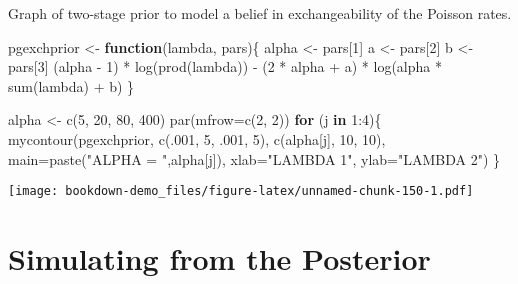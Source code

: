 \documentclass[
]{book}
\newenvironment{Shaded}{\begin{snugshade}}{\end{snugshade}}
\newcommand{\AttributeTok}[1]{\textcolor[rgb]{0.77,0.63,0.00}{#1}}
\newcommand{\ControlFlowTok}[1]{\textcolor[rgb]{0.13,0.29,0.53}{\textbf{#1}}}
\newcommand{\DecValTok}[1]{\textcolor[rgb]{0.00,0.00,0.81}{#1}}
\newcommand{\FunctionTok}[1]{\textcolor[rgb]{0.00,0.00,0.00}{#1}}
\newcommand{\NormalTok}[1]{#1}
\newcommand{\OtherTok}[1]{\textcolor[rgb]{0.56,0.35,0.01}{#1}}
\newcommand{\SpecialCharTok}[1]{\textcolor[rgb]{0.00,0.00,0.00}{#1}}
\newcommand{\StringTok}[1]{\textcolor[rgb]{0.31,0.60,0.02}{#1}}
\begin{document}
Graph of two-stage prior to model a belief in exchangeability of the Poisson rates.

\begin{Shaded}
\begin{Highlighting}[]
\NormalTok{pgexchprior }\OtherTok{\textless{}{-}} \ControlFlowTok{function}\NormalTok{(lambda, pars)\{}
\NormalTok{alpha }\OtherTok{\textless{}{-}}\NormalTok{ pars[}\DecValTok{1}\NormalTok{]}
\NormalTok{a }\OtherTok{\textless{}{-}}\NormalTok{ pars[}\DecValTok{2}\NormalTok{]}
\NormalTok{b }\OtherTok{\textless{}{-}}\NormalTok{ pars[}\DecValTok{3}\NormalTok{]}
\NormalTok{(alpha }\SpecialCharTok{{-}} \DecValTok{1}\NormalTok{) }\SpecialCharTok{*} \FunctionTok{log}\NormalTok{(}\FunctionTok{prod}\NormalTok{(lambda)) }\SpecialCharTok{{-}} 
\NormalTok{  (}\DecValTok{2} \SpecialCharTok{*}\NormalTok{ alpha }\SpecialCharTok{+}\NormalTok{ a) }\SpecialCharTok{*} \FunctionTok{log}\NormalTok{(alpha }\SpecialCharTok{*} \FunctionTok{sum}\NormalTok{(lambda) }\SpecialCharTok{+}\NormalTok{ b)}
\NormalTok{\}}
\end{Highlighting}
\end{Shaded}

\begin{Shaded}
\begin{Highlighting}[]
\NormalTok{alpha }\OtherTok{\textless{}{-}} \FunctionTok{c}\NormalTok{(}\DecValTok{5}\NormalTok{, }\DecValTok{20}\NormalTok{, }\DecValTok{80}\NormalTok{, }\DecValTok{400}\NormalTok{)}
\FunctionTok{par}\NormalTok{(}\AttributeTok{mfrow=}\FunctionTok{c}\NormalTok{(}\DecValTok{2}\NormalTok{, }\DecValTok{2}\NormalTok{))}
\ControlFlowTok{for}\NormalTok{ (j }\ControlFlowTok{in} \DecValTok{1}\SpecialCharTok{:}\DecValTok{4}\NormalTok{)\{}
    \FunctionTok{mycontour}\NormalTok{(pgexchprior,}
              \FunctionTok{c}\NormalTok{(.}\DecValTok{001}\NormalTok{, }\DecValTok{5}\NormalTok{, .}\DecValTok{001}\NormalTok{, }\DecValTok{5}\NormalTok{),}
              \FunctionTok{c}\NormalTok{(alpha[j], }\DecValTok{10}\NormalTok{, }\DecValTok{10}\NormalTok{),}
          \AttributeTok{main=}\FunctionTok{paste}\NormalTok{(}\StringTok{"ALPHA = "}\NormalTok{,alpha[j]),}
         \AttributeTok{xlab=}\StringTok{"LAMBDA 1"}\NormalTok{, }\AttributeTok{ylab=}\StringTok{"LAMBDA 2"}\NormalTok{)}
\NormalTok{\}}
\end{Highlighting}
\end{Shaded}

\texttt{[image: bookdown-demo\_files/figure-latex/unnamed-chunk-150-1.pdf]}

\hypertarget{simulating-from-the-posterior}{%
\section{Simulating from the Posterior}\label{simulating-from-the-posterior}}
\end{document}
